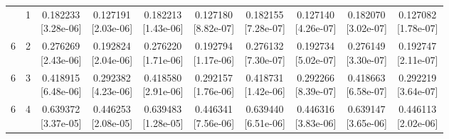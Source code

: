 \documentclass[12pt,letterpaper]{article}
\theoremstyle{plain}
\theoremstyle{definition}
\begin{document}
\begin{table}[p]
\begin{adjustbox}{max width=\linewidth}
\begin{tabular}{@{}rr*{8}{c}@{}}
\addlinespace[2pt]
6 & 1 & \shortstack{0.182233\\[-1pt]{\scriptsize[3.28e-06]}} & \shortstack{0.127191\\[-1pt]{\scriptsize[2.03e-06]}} & \shortstack{0.182213\\[-1pt]{\scriptsize[1.43e-06]}} & \shortstack{0.127180\\[-1pt]{\scriptsize[8.82e-07]}} & \shortstack{0.182155\\[-1pt]{\scriptsize[7.28e-07]}} & \shortstack{0.127140\\[-1pt]{\scriptsize[4.26e-07]}} & \shortstack{0.182070\\[-1pt]{\scriptsize[3.02e-07]}} & \shortstack{0.127082\\[-1pt]{\scriptsize[1.78e-07]}}\\
6 & 2 & \shortstack{0.276269\\[-1pt]{\scriptsize[2.43e-06]}} & \shortstack{0.192824\\[-1pt]{\scriptsize[2.04e-06]}} & \shortstack{0.276220\\[-1pt]{\scriptsize[1.71e-06]}} & \shortstack{0.192794\\[-1pt]{\scriptsize[1.17e-06]}} & \shortstack{0.276132\\[-1pt]{\scriptsize[7.30e-07]}} & \shortstack{0.192734\\[-1pt]{\scriptsize[5.02e-07]}} & \shortstack{0.276149\\[-1pt]{\scriptsize[3.30e-07]}} & \shortstack{0.192747\\[-1pt]{\scriptsize[2.11e-07]}}\\
6 & 3 & \shortstack{0.418915\\[-1pt]{\scriptsize[6.48e-06]}} & \shortstack{0.292382\\[-1pt]{\scriptsize[4.23e-06]}} & \shortstack{0.418580\\[-1pt]{\scriptsize[2.91e-06]}} & \shortstack{0.292157\\[-1pt]{\scriptsize[1.76e-06]}} & \shortstack{0.418731\\[-1pt]{\scriptsize[1.42e-06]}} & \shortstack{0.292266\\[-1pt]{\scriptsize[8.39e-07]}} & \shortstack{0.418663\\[-1pt]{\scriptsize[6.58e-07]}} & \shortstack{0.292219\\[-1pt]{\scriptsize[3.64e-07]}}\\
6 & 4 & \shortstack{0.639372\\[-1pt]{\scriptsize[3.37e-05]}} & \shortstack{0.446253\\[-1pt]{\scriptsize[2.08e-05]}} & \shortstack{0.639483\\[-1pt]{\scriptsize[1.28e-05]}} & \shortstack{0.446341\\[-1pt]{\scriptsize[7.56e-06]}} & \shortstack{0.639440\\[-1pt]{\scriptsize[6.51e-06]}} & \shortstack{0.446316\\[-1pt]{\scriptsize[3.83e-06]}} & \shortstack{0.639147\\[-1pt]{\scriptsize[3.65e-06]}} & \shortstack{0.446113\\[-1pt]{\scriptsize[2.02e-06]}}\\

\end{tabular}
\end{adjustbox}
\end{table}
\end{document}
